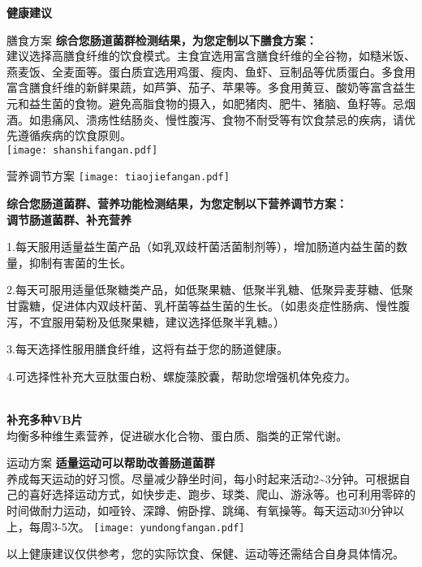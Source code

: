

\usepackage{graphicx}
\graphicspath{{cores/}}



\vspace*{5mm}
\setlength{\arrayrulewidth}{1pt}
\fontsize{9.3pt}{11pt}\selectfont
\color{gray2}

\centerline{\bf\sanhao 健康建议}

\vspace*{2mm}

\begin{LRaside}[.20]{膳食方案}
{\bf *综合您肠道菌群检测结果，为您定制以下膳食方案：}\\
{\indent 建议选择高膳食纤维的饮食模式。主食宜选用富含膳食纤维的全谷物，如糙米饭、燕麦饭、全麦面等。蛋白质宜选用鸡蛋、瘦肉、鱼虾、豆制品等优质蛋白。多食用富含膳食纤维的新鲜果蔬，如芦笋、茄子、苹果等。多食用黄豆、酸奶等富含益生元和益生菌的食物。避免高脂食物的摄入，如肥猪肉、肥牛、猪脑、鱼籽等。忌烟酒。如患痛风、溃疡性结肠炎、慢性腹泻、食物不耐受等有饮食禁忌的疾病，请优先遵循疾病的饮食原则。}\\
\asidebreak %
\noindent
\texttt{[image: shanshifangan.pdf]}

\end{LRaside}


\begin{LRaside}[.70]{营养调节方案}
\noindent
\texttt{[image: tiaojiefangan.pdf]}

\asidebreak %
{\bf *综合您肠道菌群、营养功能检测结果，为您定制以下营养调节方案：}\\
{\bf 调节肠道菌群、补充营养}\\{\indent 1.每天服用适量益生菌产品（如乳双歧杆菌活菌制剂等），增加肠道内益生菌的数量，抑制有害菌的生长。

2.每天可服用适量低聚糖类产品，如低聚果糖、低聚半乳糖、低聚异麦芽糖、低聚甘露糖，促进体内双歧杆菌、乳杆菌等益生菌的生长。（如患炎症性肠病、慢性腹泻，不宜服用菊粉及低聚果糖，建议选择低聚半乳糖。）

3.每天选择性服用膳食纤维，这将有益于您的肠道健康。

4.可选择性补充大豆肽蛋白粉、螺旋藻胶囊，帮助您增强机体免疫力。}\\
{\bf 补充多种VB片}\\{\indent 均衡多种维生素营养，促进碳水化合物、蛋白质、脂类的正常代谢。}\\
\end{LRaside}

\begin{LRaside}[.20]{运动方案}
{\bf *适量运动可以帮助改善肠道菌群}\\
{\indent 养成每天运动的好习惯。尽量减少静坐时间，每小时起来活动2\textasciitilde 3分钟。可根据自己的喜好选择运动方式，如快步走、跑步、球类、爬山、游泳等。也可利用零碎的时间做耐力运动，如哑铃、深蹲、俯卧撑、跳绳、有氧操等。每天运动30分钟以上，每周3-5次。}
\asidebreak %
\noindent
\texttt{[image: yundongfangan.pdf]}

\end{LRaside}

{\noindent\qihao *以上健康建议仅供参考，您的实际饮食、保健、运动等还需结合自身具体情况。}


